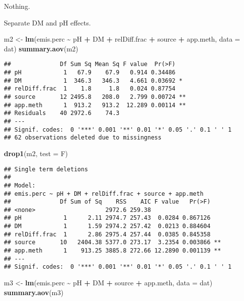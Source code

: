 \documentclass[
]{article}
\newenvironment{Shaded}{\begin{snugshade}}{\end{snugshade}}
\newcommand{\AttributeTok}[1]{\textcolor[rgb]{0.13,0.29,0.53}{#1}}
\newcommand{\FunctionTok}[1]{\textcolor[rgb]{0.13,0.29,0.53}{\textbf{#1}}}
\newcommand{\NormalTok}[1]{#1}
\newcommand{\OtherTok}[1]{\textcolor[rgb]{0.56,0.35,0.01}{#1}}
\newcommand{\SpecialCharTok}[1]{\textcolor[rgb]{0.81,0.36,0.00}{\textbf{#1}}}
\newcommand{\StringTok}[1]{\textcolor[rgb]{0.31,0.60,0.02}{#1}}
\begin{document}
Nothing.

Separate DM and pH effects.

\begin{Shaded}
\begin{Highlighting}[]
\NormalTok{m2 }\OtherTok{\textless{}{-}} \FunctionTok{lm}\NormalTok{(emis.perc }\SpecialCharTok{\textasciitilde{}}\NormalTok{ pH }\SpecialCharTok{+}\NormalTok{ DM }\SpecialCharTok{+}\NormalTok{ relDiff.frac }\SpecialCharTok{+}\NormalTok{ source }\SpecialCharTok{+}\NormalTok{ app.meth, }\AttributeTok{data =}\NormalTok{ dat)}
\FunctionTok{summary.aov}\NormalTok{(m2)}
\end{Highlighting}
\end{Shaded}

\begin{verbatim}
##              Df Sum Sq Mean Sq F value  Pr(>F)   
## pH            1   67.9    67.9   0.914 0.34486   
## DM            1  346.3   346.3   4.661 0.03692 * 
## relDiff.frac  1    1.8     1.8   0.024 0.87754   
## source       12 2495.8   208.0   2.799 0.00724 **
## app.meth      1  913.2   913.2  12.289 0.00114 **
## Residuals    40 2972.6    74.3                   
## ---
## Signif. codes:  0 '***' 0.001 '**' 0.01 '*' 0.05 '.' 0.1 ' ' 1
## 62 observations deleted due to missingness
\end{verbatim}

\begin{Shaded}
\begin{Highlighting}[]
\FunctionTok{drop1}\NormalTok{(m2, }\AttributeTok{test =} \StringTok{\textquotesingle{}F\textquotesingle{}}\NormalTok{)}
\end{Highlighting}
\end{Shaded}

\begin{verbatim}
## Single term deletions
## 
## Model:
## emis.perc ~ pH + DM + relDiff.frac + source + app.meth
##              Df Sum of Sq    RSS    AIC F value   Pr(>F)   
## <none>                    2972.6 259.38                    
## pH            1      2.11 2974.7 257.43  0.0284 0.867126   
## DM            1      1.59 2974.2 257.42  0.0213 0.884604   
## relDiff.frac  1      2.86 2975.4 257.44  0.0385 0.845358   
## source       10   2404.38 5377.0 273.17  3.2354 0.003866 **
## app.meth      1    913.25 3885.8 272.66 12.2890 0.001139 **
## ---
## Signif. codes:  0 '***' 0.001 '**' 0.01 '*' 0.05 '.' 0.1 ' ' 1
\end{verbatim}

\begin{Shaded}
\begin{Highlighting}[]
\NormalTok{m3 }\OtherTok{\textless{}{-}} \FunctionTok{lm}\NormalTok{(emis.perc }\SpecialCharTok{\textasciitilde{}}\NormalTok{ pH }\SpecialCharTok{+}\NormalTok{ DM }\SpecialCharTok{+}\NormalTok{ source }\SpecialCharTok{+}\NormalTok{ app.meth, }\AttributeTok{data =}\NormalTok{ dat)}
\FunctionTok{summary.aov}\NormalTok{(m3)}
\end{Highlighting}
\end{Shaded}
\end{document}
